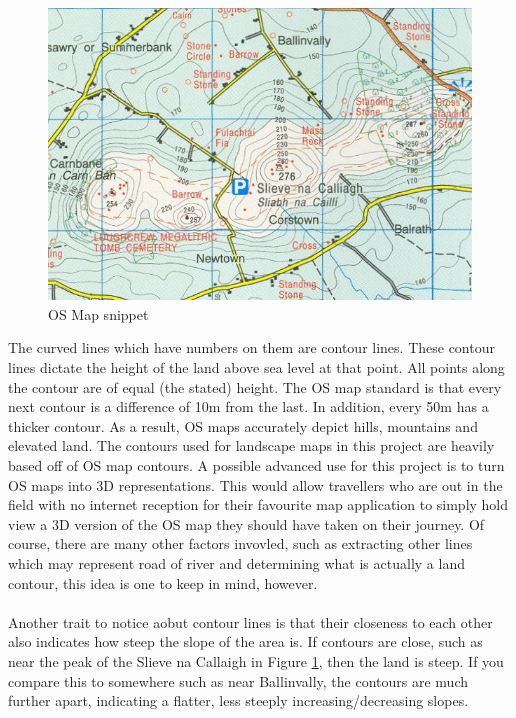 \documentclass[11pt]{article}
\begin{document}
\begin{figure}
	\centering
	\includegraphics[scale=0.7]{pics/OSmap.png}
	\caption{OS Map snippet}
	\label{OSmap}
\end{figure}

The curved lines which have numbers on them are contour lines. These contour
lines dictate the height of the land above sea level at that point. All points
along the contour are of equal (the stated) height. The OS map standard is 
that every next contour is a difference of 10m from the last. In addition, every 
50m has a thicker contour. As a result, OS maps accurately depict hills, mountains
and elevated land. The contours used for landscape maps in this project are 
heavily based off of OS map contours. A possible advanced use for this project
is to turn OS maps into 3D representations. This would allow travellers who are
out in the field with no internet reception for their favourite map application to
simply hold view a 3D version of the OS map they should have taken on their journey.
Of course, there are many other factors invovled, such as extracting other lines
which may represent road of river and determining what is actually a land contour, 
this idea is one to keep in mind, however.\\
\\
Another trait to notice aobut contour lines is that their closeness to each other
also indicates how steep the slope of the area is. If contours are close, such as
near the peak of the Slieve	na Callaigh in Figure \ref{OSmap}, then the land is 
steep. If you compare this to somewhere such as near Ballinvally, the contours 
are much further apart, indicating a flatter, less steeply increasing/decreasing 
slopes. 
\end{document}
